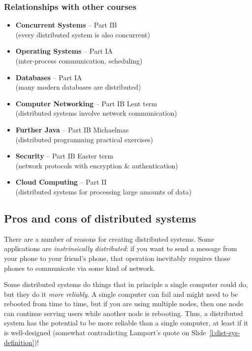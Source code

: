 \begin{frame}
    \label{s:other-courses}
    \frametitle{Relationships with other courses}
    \begin{itemize}
        \item \textbf{Concurrent Systems} -- Part IB\\
            (every distributed system is also concurrent)
        \item \textbf{Operating Systems} -- Part IA\\
            (inter-process communication, scheduling)
        \item \textbf{Databases} -- Part IA\\
            (many modern databases are distributed)
        \item \textbf{Computer Networking} -- Part IB Lent term\\
            (distributed systems involve network communication)
        \item \textbf{Further Java} -- Part IB Michaelmas\\
            (distributed programming practical exercises)
        \item \textbf{Security} -- Part IB Easter term\\
            (network protocols with encryption \& authentication)
        \item \textbf{Cloud Computing} -- Part II\\
            (distributed systems for processing large amounts of data)
    \end{itemize}
\end{frame}
\label{l:other-courses}


\subsection{Pros and cons of distributed systems}

There are a number of reasons for creating distributed systems.
Some applications are \emph{instrinsically distributed}: if you want to send a message from your phone to your friend's phone, that operation inevitably requires those phones to communicate via some kind of network.

Some distributed systems do things that in principle a single computer could do, but they do it \emph{more reliably}.
A single computer can fail and might need to be rebooted from time to time, but if you are using multiple nodes, then one node can continue serving users while another node is rebooting.
Thus, a distributed system has the potential to be more reliable than a single computer, at least if it is well-designed (somewhat contradicting Lamport's quote on Slide~\ref{l:dist-sys-definition})!

